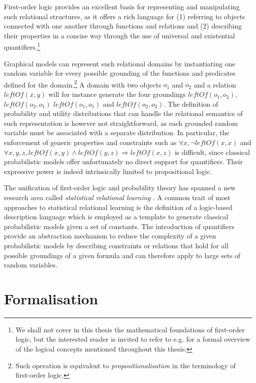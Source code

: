 First-order logic provides an excellent basis for representing and manipulating such relational structures, as it offers a rich language for (1) referring to objects connected with one another through functions and relations and (2) describing their properties in a concise way through the use of universal and existential quantifiers.\footnote{We shall not cover in this thesis the mathematical foundations of first-order logic, but the interested reader is invited to refer to e.g. \cite{gamut1991logic} for a formal overview of the logical concepts mentioned throughout this thesis.}

Graphical models can represent such relational domains by instantiating one random variable for every possible grounding of the functions and predicates defined for the domain.\footnote{Such operation is equivalent to \textit{propositionalisation} in the terminology of first-order logic.}  A domain with two objects $o_1$ and $o_2$ and a relation $\mathit{leftOf}(x,y)$ will for instance generate the four groundings $\mathit{leftOf}(o_1,o_2)$, $\mathit{leftOf}(o_2,o_1)$ $\mathit{leftOf}(o_1,o_1)$ and $\mathit{leftOf}(o_2,o_2)$. The definition of probability and utility distributions that can handle the relational semantics of such representation is however not straightforward, as each grounded random variable must be associated with a separate distribution. In particular, the enforcement of generic properties and constraints such as $\forall x, \neg \mathit{leftOf}(x,x)$ and $\forall x, y, z, \mathit{leftOf}(x,y) \land \mathit{leftOf}(y,z) \Rightarrow \mathit{leftOf}(x,z)$ is difficult, since classical probabilistic models offer unfortunately no direct support for quantifiers.  Their expressive power is indeed intrinsically limited to propositional logic. 
 
The unification of first-order logic and probability theory has spanned a new research area called \textit{statistical relational learning} \citep{getoor:srlbook07}. A common trait of most approaches to statistical relational learning is the definition of a logic-based description language which is employed as a template to generate classical probabilistic models given a set of constants. The introduction of quantifiers provide an abstraction mechanism to reduce the complexity of a given probabilistic models by describing constraints or relations that hold for all possible groundings of a given formula and can therefore apply to large sets of random variables. 

\section{Formalisation}
\label{sec:formalisation}

